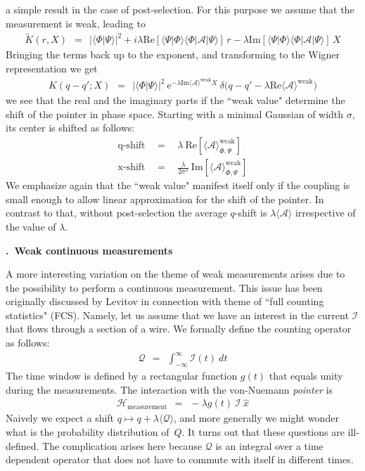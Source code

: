 \documentclass[onecolumn,fleqn, 11pt]{revtex4}
\newcommand{\im}{\mathrm{Im}}
\newcommand{\re}{\mathrm{Re}}
\newcommand{\eexp}{\mathrm{e}^}
\newcommand{\tbox}[1]{\text{#1}}
\newcommand{\beq}{\begin{eqnarray}}
\newcommand{\eeq}{\end{eqnarray}}
\renewcommand{\thesubsection}{\arabic{subsection}}
\renewcommand{\thesubsubsection}{\arabic{subsubsection}}
\newcommand{\sheadC}[1]
{
\addtocounter{subsubsection}{1}
\vspace{5mm}
{\bf \thesubsection.\thesubsubsection \ #1}  
\nopagebreak
\phantomsection
}
\begin{document}
a simple result in the case of post-selection. 
For this purpose we assume that the measurement is weak, leading to 
\beq
\tilde{K}(r,X) \ \ = \ \  
|\langle \Phi|\Psi \rangle|^2 
+ i \lambda \re\left[ \langle \Psi|\Phi \rangle \langle \Phi| \mathcal{A} |\Psi \rangle   \right] \, r  
- \lambda \im\left[  \langle \Psi|\Phi \rangle \langle \Phi| \mathcal{A} |\Psi \rangle \right] \, X
\eeq
Bringing the terms back up to the exponent, 
and transforming to the Wigner representation we get
\beq
K(q{-}q';X) \ \ = \ \ |\langle \Phi|\Psi \rangle|^2 
\ \eexp{-\lambda \im\langle \mathcal{A} \rangle^{\tbox{weak}} X}
\ \delta\Big(q-q'-\lambda \re\langle \mathcal{A} \rangle^{\tbox{weak}} \Big)
\eeq
we see that the real and the imaginary parts if the ``weak value" 
determine the shift of the pointer in phase space. 
Starting with a minimal Gaussian of width $\sigma$, 
its center is shifted as follows:
\beq
\mbox{q-shift} \ \ &=& \ \ \lambda \ \re\left[\langle \mathcal{A} \rangle_{\Phi,\Psi}^{\tbox{weak}}\right]
\\
\mbox{x-shift} \  \ &=& \ \ \frac{\lambda}{2\sigma^2} \ \im\left[\langle \mathcal{A} \rangle_{\Phi,\Psi}^{\tbox{weak}}\right]
\eeq
We emphasize again that the ``weak value" manifest itself
only if the coupling is small enough to allow linear approximation 
for the shift of the pointer. In contrast to that, 
without post-selection  the average $q$-shift is ${\lambda \langle \mathcal{A} \rangle}$ 
irrespective of the value of $\lambda$.


\sheadC{Weak continuous measurements}

A more interesting variation on the theme of weak measurements  
arises due to the possibility to perform a continuous measurement.
This issue has been originally discussed by Levitov in connection 
with theme of ``full counting statistics" (FCS). 
Namely, let us assume that we have an interest in the current $\mathcal{I}$ that flows 
through a section of a wire. We formally define the counting 
operator as follows:  
\beq
\mathcal{Q} \ \ = \ \ \int_{-\infty}^{\infty} \mathcal{I}(t) \ dt
\eeq
The time window is defined by a rectangular function $g(t)$  that 
equals unity during the measurements. The interaction 
with the von-Nuemann {\em pointer} is  
\beq
\mathcal{H}_{\tbox{measurement}} \ \ = \ \ -\lambda g(t) \ \mathcal{I} \ \hat{x}
\eeq
Naively we expect a shift ${q \mapsto q + \lambda \langle \mathcal{Q} \rangle}$, 
and more generally we might wonder what is the probability distribution of~$Q$.
It turns out that these questions are ill-defined. 
The complication arises here because $\mathcal{Q}$ is an integral 
over a time dependent operator that does not have to commute 
with itself in different times. 
\end{document}
